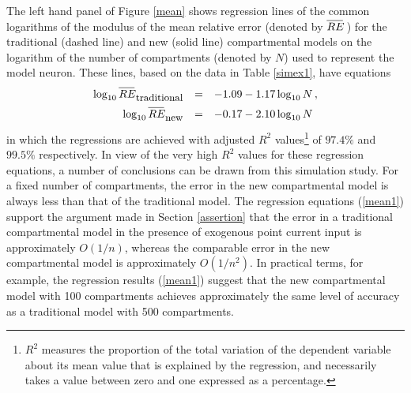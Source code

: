 The left hand panel of Figure \ref{mean} shows regression lines of
the common logarithms of the modulus of the mean relative error
(denoted by $\overline{RE\phantom{\vert\hskip-4pt}}\;$) for the
traditional (dashed line) and new (solid line) compartmental
models on the logarithm of the number of compartments (denoted by
$N$) used to represent the model neuron. These lines, based on the
data in Table \ref{simex1}, have equations
\begin{equation}\label{mean1}
\begin{array}{rcl}
\log_{10}\overline{RE\phantom{\vert\hskip-4pt}}_\mathrm{\,\small
traditional} & = & -1.09-1.17\log_{10}N\,, \\[5pt]
\log_{10}\overline{RE\phantom{\vert\hskip-4pt}}_\mathrm{\,\small
new} & = & -0.17-2.10\log_{10}N
\end{array}
\end{equation}
in which the regressions are achieved with adjusted $R^2$
values\footnote{$R^2$ measures the proportion of the total
variation of the dependent variable about its mean value that is
explained by the regression, and necessarily takes a value between
zero and one expressed as a percentage.} of $97.4\%$ and $99.5\%$
respectively. In view of the very high $R^2$ values for these
regression equations, a number of conclusions can be drawn from
this simulation study. For a fixed number of compartments, the
error in the new compartmental model is always less than that of
the traditional model. The regression equations (\ref{mean1})
support the argument made in Section \ref{assertion} that the
error in a traditional compartmental model in the presence of
exogenous point current input is approximately $O(1/n)$, whereas
the comparable error in the new compartmental model is
approximately $O(1/n^2)$. In practical terms, for example, the
regression results (\ref{mean1}) suggest that the new
compartmental model with 100 compartments achieves approximately
the same level of accuracy as a traditional model with 500
compartments.

